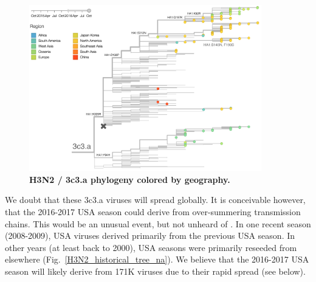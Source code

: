 \documentclass[11pt,oneside,letterpaper]{article}
\begin{document}
\begin{figure}[H]
	\centering
	\includegraphics[width=0.9\textwidth]{../figures/sep-2016/H3N2_3c3a_tree.png}
	\caption{\textbf{H3N2 / 3c3.a phylogeny colored by geography.}
	}
	\label{H3N2_3c3a_tree}
\end{figure}

\pagebreak

We doubt that these 3c3.a viruses will spread globally. It is conceivable however, that the 2016-2017 USA season could derive from over-summering transmission chains. This would be an unusual event, but not unheard of \cite{bedford2010global,bedford2015global}. In one recent season (2008-2009), USA viruses derived primarily from the previous USA season. In other years (at least back to 2000), USA seasons were primarily reseeded from elsewhere (Fig.\ \ref{H3N2_historical_tree_na}). We believe that the 2016-2017 USA season will likely derive from 171K viruses due to their rapid spread (see below).
\end{document}
